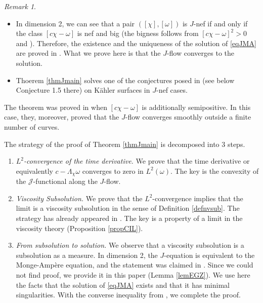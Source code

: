 \documentclass{amsart}
\numberwithin{equation}{section}
\theoremstyle{plain}
\theoremstyle{definition}
\theoremstyle{remark}
\newtheorem{remark}[equation]{Remark}
\begin{document}
\begin{remark}
\begin{itemize}
    \item In dimension 2, we can see that a pair $([\chi],[\omega])$ is $J$-nef if and only if the class $[c\chi-\omega]$ is nef and big (the bigness follows from $[c\chi-\omega]^2>0$ and \cite[Theorem 0.5]{DP}). Therefore, the existence and the uniqueness of the solution of \eqref{eqJMA} are proved in \cite{BEGZ}. What we prove here is that the $J$-flow converges to the solution.
    \item Thoerem \ref{thmJmain} solves one of the conjectures posed in \cite{DMS} (see below Conjecture 1.5 there) on Kähler surfaces in $J$-nef cases.
\end{itemize}
\end{remark}

The theorem was proved in \cite{FLSW} when $[c\chi-\omega]$ is additionally semipositive. In this case, they, moreover, proved that the $J$-flow converges smoothly outside a finite number of curves. 

The strategy of the proof of Theorem \ref{thmJmain} is decomposed into 3 steps. 
\begin{enumerate}[label={Step \arabic*}]
    \item\label{stepslope} \textit{$L^2$-convergence of the time derivative.} We prove that the time derivative or equivalently $c-\Lambda_\chi \omega$ converges to zero in $L^2(\omega)$. The key is the convexity of the $\mathcal{J}$-functional along the $J$-flow.
    \item\label{stepvsub} \textit{Viscosity Subsolution.} We prove that the $L^2$-convergence implies that the limit is a viscosity subsolution in the sense of Definition \ref{defnvsub}. The strategy has already appeared in \cite[Proposition 21]{CS17}. The key is a property of a limit in the viscosity theory (Proposition \ref{propCIL}).
    \item\label{steppp} \textit{From subsolution to solution.} We observe that a viscosity subsolution is a subsolution as a measure. In dimension 2, the $J$-equation is equivalent to the Monge-Amp{\`e}re equation, and the statement was claimed in \cite[Corollary 2.6]{EGZ}. Since we could not find proof, we provide it in this paper (Lemma \ref{lemEGZ}). We use here the facts that the solution of \eqref{eqJMA} exists and that it has minimal singularities. With the converse inequality from \cite[Proposition 1.20]{BEGZ}, we complete the proof.
\end{enumerate}
\end{document}
